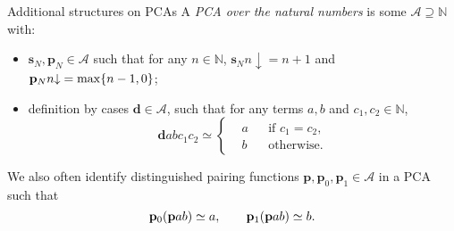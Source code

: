 \documentclass{beamer}
\theoremstyle{definition}
\begin{document}
\begin{frame}{Additional structures on PCAs}
  A \emph{PCA over the natural numbers} is some $\mathcal{A} \supseteq \mathbb{N}$ with:
  \begin{itemize}
    \item $\mathbf{s}_N, \mathbf{p}_N \in \mathcal{A}$ such that for any $n \in \mathbb{N}$, $\mathbf{s}_N n {\downarrow} = n + 1$ and $\mathbf{p}_N n {\downarrow} = \max\mleft\{n - 1, 0\mright\}$;
    \item definition by cases $\mathbf{d} \in \mathcal{A}$, such that for any terms $a, b$ and $c_1, c_2 \in \mathbb{N}$,
          \[\mathbf{d}abc_1c_2 \simeq \left\{\begin{aligned}
               & a &  & \text{if } c_1 = c_2, \\
               & b &  & \text{otherwise}.
            \end{aligned}\right.\]
  \end{itemize}

  \pause

  \vspace{0.6em}
  We also often identify distinguished pairing functions $\mathbf{p}, \mathbf{p}_0, \mathbf{p}_1 \in \mathcal{A}$ in a PCA such that
  \[\mathbf{p}_0\mleft(\mathbf{p}ab\mright) \simeq a, \qquad \mathbf{p}_1\mleft(\mathbf{p}ab\mright) \simeq b.\]
\end{frame}
\end{document}
